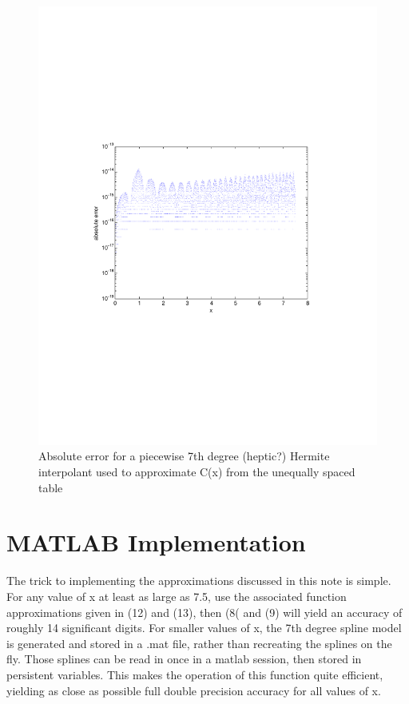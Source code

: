 \documentclass[a4paper,11pt]{article}
\begin{document}
\begin{figure}
\centering
    \includegraphics[width=5in]{hepticHermite.pdf}
        \caption{Absolute error for a piecewise 7th degree (heptic?) Hermite interpolant used to approximate C(x) from the unequally spaced table}
\end{figure}


\section{MATLAB Implementation}
The trick to implementing the approximations discussed in this note is simple. For any value of x at least as large as 7.5, use the associated function approximations given in (12) and (13), then (8( and (9) will yield an accuracy of roughly 14 significant digits. For smaller values of x, the 7th degree spline model is generated and stored in a .mat file, rather than recreating the splines on the fly. Those splines can be read in once in a matlab session, then stored in persistent variables. This makes the operation of this function quite efficient, yielding as close as possible full double precision accuracy for all values of x.
\end{document}
